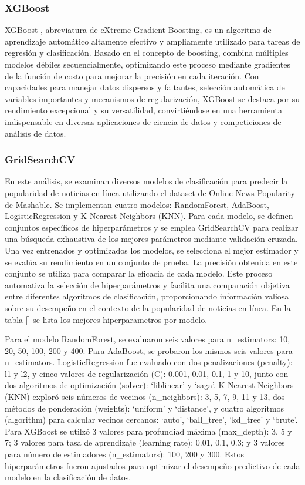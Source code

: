 \documentclass[
  number,
  preprint,
  3p,
  twocolumn]{elsarticle}
\begin{document}
\subsubsection{XGBoost}\label{xgboost}

XGBoost \citep{Chen_2016}, abreviatura de eXtreme Gradient Boosting, es
un algoritmo de aprendizaje automático altamente efectivo y ampliamente
utilizado para tareas de regresión y clasificación. Basado en el
concepto de boosting, combina múltiples modelos débiles secuencialmente,
optimizando este proceso mediante gradientes de la función de costo para
mejorar la precisión en cada iteración. Con capacidades para manejar
datos dispersos y faltantes, selección automática de variables
importantes y mecanismos de regularización, XGBoost se destaca por su
rendimiento excepcional y su versatilidad, convirtiéndose en una
herramienta indispensable en diversas aplicaciones de ciencia de datos y
competiciones de análisis de datos.

\subsubsection{GridSearchCV}\label{gridsearchcv}

En este análisis, se examinan diversos modelos de clasificación para
predecir la popularidad de noticias en línea utilizando el dataset de
Online News Popularity de Mashable. Se implementan cuatro modelos:
RandomForest, AdaBoost, LogisticRegression y K-Nearest Neighbors (KNN).
Para cada modelo, se definen conjuntos específicos de hiperparámetros y
se emplea GridSearchCV para realizar una búsqueda exhaustiva de los
mejores parámetros mediante validación cruzada. Una vez entrenados y
optimizados los modelos, se selecciona el mejor estimador y se evalúa su
rendimiento en un conjunto de prueba. La precisión obtenida en este
conjunto se utiliza para comparar la eficacia de cada modelo. Este
proceso automatiza la selección de hiperparámetros y facilita una
comparación objetiva entre diferentes algoritmos de clasificación,
proporcionando información valiosa sobre su desempeño en el contexto de
la popularidad de noticias en línea. En la tabla \ref{} se lista los
mejores hiperparametros por modelo.

Para el modelo RandomForest, se evaluaron seis valores para
n\_estimators: 10, 20, 50, 100, 200 y 400. Para AdaBoost, se probaron
los mismos seis valores para n\_estimators. LogisticRegression fue
evaluado con dos penalizaciones (penalty): l1 y l2, y cinco valores de
regularización (C): 0.001, 0.01, 0.1, 1 y 10, junto con dos algoritmos
de optimización (solver): `liblinear' y `saga'. K-Nearest Neighbors
(KNN) exploró seis números de vecinos (n\_neighbors): 3, 5, 7, 9, 11 y
13, dos métodos de ponderación (weights): `uniform' y `distance', y
cuatro algoritmos (algorithm) para calcular vecinos cercanos: `auto',
`ball\_tree', `kd\_tree' y `brute'. Para XGBoost se utilzó 3 valores
para profundiad máxima (max\_depth): 3, 5 y 7; 3 valores para tasa de
aprendizaje (learning rate): 0.01, 0.1, 0.3; y 3 valores para número de
estimadores (n\_estimators): 100, 200 y 300. Estos hiperparámetros
fueron ajustados para optimizar el desempeño predictivo de cada modelo
en la clasificación de datos.
\end{document}
